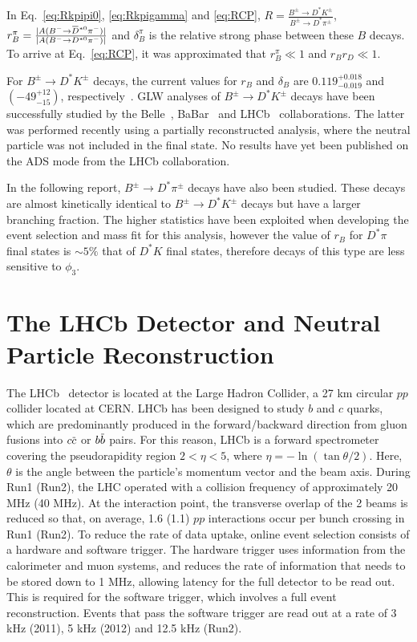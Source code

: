 \documentclass[oneside,12pt]{article}
\newcommand{\overbar}[1]{\mkern 1.5mu\overline{\mkern-1.5mu#1\mkern-1.5mu}\mkern
1.5mu}
\begin{document}
\noindent In Eq.~\eqref{eq:Rkpipi0}, \eqref{eq:Rkpigamma} and \eqref{eq:RCP},
$R=\frac{B^{\pm}\rightarrow D^* K^{\pm}}{B^{\pm}\rightarrow D^* \pi^{\pm}}$,
$r_B^{\pi}=\frac{|A(B^{-}\rightarrow
\overbar{D}^{*0}\pi^-)|}{|A(B^{-}\rightarrow {D}^{*0}\pi^-)|}$ and
$\delta_{B}^{\pi}$ is the relative strong phase between these $B$ decays. To
arrive at Eq.~\eqref{eq:RCP}, it was approximated that $r_B^{\pi}\ll 1$ and
$r_Br_D \ll 1$.

For $B^{\pm}\rightarrow D^{*}K^{\pm}$ decays, the
current values for $r_B$ and $\delta_B$ are $0.119^{+0.018}_{-0.019}$ and
$(-49^{+12}_{-15})$\degree, respectively~\cite{website:CKMFitter}. GLW analyses
of $B^{\pm}\rightarrow D^{*}K^{\pm}$ decays have been successfully studied by
the Belle~\cite{BelleGLW}, BaBar~\cite{BaBarGLW} and LHCb~\cite{PartReco}
collaborations. The latter was performed recently using a partially
reconstructed analysis, where the neutral particle was not included in the final
state. No results have yet been published on the ADS mode from the LHCb
collaboration.   

In the following report, $B^{\pm}\rightarrow D^{*}\pi^{\pm}$ decays have also
been studied. These decays are almost kinetically identical to
$B^{\pm}\rightarrow D^{*}K^{\pm}$ decays but have a larger branching fraction.
The higher statistics have been exploited when developing the event selection
and mass fit for this analysis, however the value of $r_B$ for $D^*\pi$ final
states is $\sim 5\%$ that of $D^*K$ final states, therefore decays of this
type are less sensitive to $\phi_3$.

\section{The LHCb Detector and Neutral Particle Reconstruction} \label{detector}
The LHCb~\cite{LHCbDetector} detector is located at the Large Hadron Collider, a
27 km circular $pp$ collider located at CERN. LHCb has been designed to study
$b$ and $c$ quarks, which are predominantly produced in the forward/backward
direction from gluon fusions into $c\overbar{c}$ or $b\overbar{b}$ pairs. For
this reason, LHCb is a forward spectrometer covering the pseudorapidity region
$2 < \eta < 5$, where $\eta = -\ln (\tan \theta / 2)$.  Here, $\theta$ is the
angle between the particle's momentum vector and the beam axis. During Run1
(Run2), the LHC operated with a collision frequency of approximately 20 MHz (40
MHz). At the interaction point, the transverse overlap of the 2 beams is reduced
so that, on average, 1.6 (1.1) $pp$ interactions occur per bunch crossing in
Run1 (Run2). To reduce the rate of data uptake, online event selection consists
of a hardware and software trigger. The hardware trigger uses information from
the calorimeter and muon systems, and reduces the rate of information that needs
to be stored down to 1 MHz, allowing latency for the full detector to be read
out. This is required for the software trigger, which involves a full event
reconstruction.  Events that pass the software trigger are read out at a rate of
3 kHz (2011), 5 kHz (2012) and 12.5 kHz (Run2).
\end{document}
